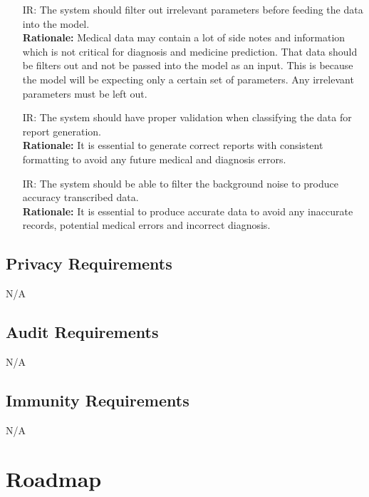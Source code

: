 \documentclass{article}
\newcounter{irnum} %
\begin{document}
\begin{itemize}
    \item [IR\refstepcounter{irnum}\theirnum \label{IR_InputCheck}:] The system should filter out irrelevant parameters before feeding the data into the model. \\
    \textbf{Rationale:} Medical data may contain a lot of side notes and information which is not critical for diagnosis and medicine prediction. That data should be filters out and not be passed into the model as an input. This is because the model will be expecting only a certain set of parameters. Any irrelevant parameters must be left out. 

    \item [IR\refstepcounter{irnum}\theirnum \label{IR_CompilingVerification}:] The system should have proper validation when classifying the data for report generation.\\
    \textbf{Rationale:} It is essential to generate correct reports with consistent formatting to avoid any future medical and diagnosis errors.

    \item [IR\refstepcounter{irnum}\theirnum \label{IR_BackNoiseFilter}:] The system should be able to filter the background noise to produce accuracy transcribed data.\\
    \textbf{Rationale:} It is essential to produce accurate data to avoid any inaccurate records, potential medical errors and incorrect diagnosis. 

\end{itemize}

\subsection{Privacy Requirements}
N/A

\subsection{Audit Requirements}
N/A

\subsection{Immunity Requirements}
N/A

\section{Roadmap}

\end{document}
